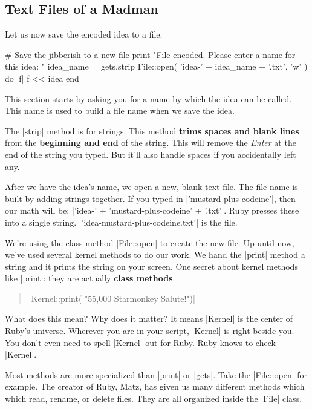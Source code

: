 \documentclass[12pt,twoside]{report}
\begin{document}
\subsection{Text Files of a Madman}



Let us now save the encoded idea to a file.


\begin{rubycode}

 # Save the jibberish to a new file
 print "File encoded.  Please enter a name for this idea: "
 idea_name = gets.strip
 File::open( 'idea-' + idea_name + '.txt', 'w' ) do |f|
   f << idea
 end

\end{rubycode}

This section starts by asking you for a name by which the idea can be
called.  This name is used to build a file name when we save the idea.

The \rubyinline|strip| method is for strings.  This
method {\bf trims spaces and blank lines} from the {\bf beginning and
  end} of the string.  This will remove the {\em Enter} at the end of
the string you typed. But it'll also handle spaces if you accidentally
left any.

After we have the idea's name, we open a new, blank text file.  The
file name is built by adding strings together.  If you typed in
\rubyinline|'mustard-plus-codeine'|, then our math
will be: \rubyinline|'idea-' + 'mustard-plus-codeine' + '.txt'|.  
Ruby presses these into a single string. 
\rubyinline|'idea-mustard-plus-codeine.txt'|
is the file.

We're using the class method \rubyinline|File::open|
to create the new file.  Up until now, we've used several kernel
methods to do our work.  We hand the
\rubyinline|print| method a string and it prints the
string on your screen.  One secret about kernel methods like
\rubyinline|print|: they are actually {\bf class
  methods}.

\begin{quote}
\rubyinline|Kernel::print( "55,000 Starmonkey Salute!")|\end{quote}


What does this mean?  Why does it matter?  It means
\rubyinline|Kernel| is the center of Ruby's
universe. Wherever you are in your script,
\rubyinline|Kernel| is right beside you.  You don't
even need to spell \rubyinline|Kernel| out for Ruby.
Ruby knows to check \rubyinline|Kernel|.

Most methods are more specialized than
\rubyinline|print| or
\rubyinline|gets|.  Take the
\rubyinline|File::open| for example.  The creator of
Ruby, Matz, has given us many different methods which which read,
rename, or delete files.  They are all organized inside the
\rubyinline|File| class.
\end{document}
